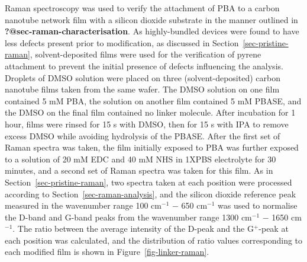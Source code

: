 \documentclass[
  a4paper,
]{scrbook}
\begin{document}
Raman spectroscopy was used to verify the attachment of PBA to a carbon
nanotube network film with a silicon dioxide substrate in the manner
outlined in \textbf{?@sec-raman-characterisation}. As highly-bundled
devices were found to have less defects present prior to modification,
as discussed in Section~\ref{sec-pristine-raman}, solvent-deposited
films were used for the verification of pyrene attachment to prevent the
initial presence of defects influencing the analysis. Droplets of DMSO
solution were placed on three (solvent-deposited) carbon nanotube films
taken from the same wafer. The DMSO solution on one film contained 5 mM
PBA, the solution on another film contained 5 mM PBASE, and the DMSO on
the final film contained no linker molecule. After incubation for 1
hour, films were rinsed for 15 s with DMSO, then for 15 s with IPA to
remove excess DMSO while avoiding hydrolysis of the PBASE. After the
first set of Raman spectra was taken, the film initially exposed to PBA
was further exposed to a solution of 20 mM EDC and 40 mM NHS in 1XPBS
electrolyte for 30 minutes, and a second set of Raman spectra was taken
for this film. As in Section~\ref{sec-pristine-raman}, two spectra taken
at each position were processed according to
Section~\ref{sec-raman-analysis}, and the silicon dioxide reference peak
measured in the wavenumber range 100 cm\(^{-1}\) \(-\) 650 cm\(^{-1}\)
was used to normalise the D-band and G-band peaks from the wavenumber
range 1300 cm\(^{-1}\) \(-\) 1650 cm\(^{-1}\). The ratio between the
average intensity of the D-peak and the G\(^+\)-peak at each position
was calculated, and the distribution of ratio values corresponding to
each modified film is shown in Figure~\ref{fig-linker-raman}.
\end{document}
